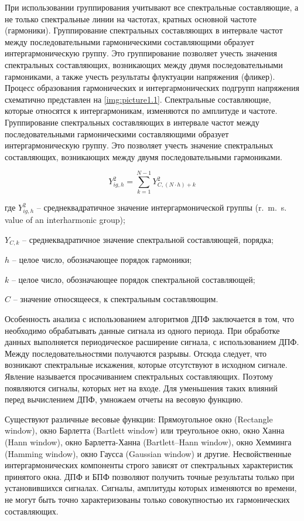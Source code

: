 При использовании группирования учитывают все спектральные составляющие, а не только спектральные линии на частотах, кратных основной частоте (гармоники). Группирование спектральных составляющих в интервале частот между последовательными гармоническими составляющими образует интергармоническую группу. Это группирование позволяет учесть значения спектральных составляющих, возникающих между двумя последовательными гармониками, а также учесть результаты флуктуации напряжения (фликер). Процесс образования гармонических и интергармонических подгрупп напряжения схематично представлен на \ref{img:picture1.1}.
Спектральные составляющие, которые относятся к интергармоникам, изменяются по амплитуде и частоте. Группирование спектральных составляющих в интервале частот между последовательными гармоническими составляющими образует интергармоническую группу. Это позволяет учесть значение спектральных составляющих, возникающих между двумя последовательными гармониками.

\begin{equation}
	\label{eq:equation1.7}
	Y_{ig,h}^2 = \displaystyle\sum_{k=1}^{N-1} Y_{C,(N \cdot h)+k}^2 
\end{equation}  

где $Y_{ig,h}^2$ – среднеквадратичное значение интергармонической группы (r.~m.~s. value of an interharmonic group);

$Y_{C,k}$ – среднеквадратичное значение спектральной составляющей, порядка;

$h$ – целое число, обозначающее порядок гармоники;

$k$ – целое число, обозначающее порядок спектральной составляющей;

$C$ – значение относящееся, к спектральным составляющим. 

Особенность анализа с использованием алгоритмов ДПФ заключается в том, что необходимо обрабатывать данные сигнала из одного периода. При обработке данных выполняется периодическое расширение сигнала, с использованием ДПФ. Между последовательностями получаются разрывы. Отсюда следует, что возникают спектральные искажения, которые отсутствуют в исходном сигнале. Явление называется просачиванием спектральных составляющих. Поэтому появляются сигналы, которых нет на входе. Для уменьшения таких влияний перед вычислением ДПФ, умножаем отчеты на весовую функцию. 

Существуют различные весовые функции: Прямоугольное окно (Rectangle window), окно Барлетта (Bartlett window) или треугольное окно, окно Ханна (Hann window), окно Барлетта-Ханна (Bartlett–Hann window), окно Хемминга (Hamming window), окно Гаусса (Gaussian window) и другие. Несвойственные интергармонических компоненты строго зависят от спектральных характеристик принятого окна. 
ДПФ и БПФ позволяют получить точные результаты только при установившихся сигналах. Сигналы, амплитуды которых изменяются во времени, не могут быть точно характеризованы только совокупностью их гармонических составляющих.

